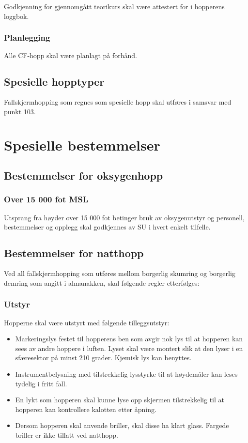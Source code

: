 Godkjenning for gjennomgått teorikurs skal være attestert for i hopperens loggbok.

\subsubsection{Planlegging}
Alle CF-hopp skal være planlagt på forhånd.

\subsection{Spesielle hopptyper}
Fallskjermhopping som regnes som spesielle hopp skal utføres i samsvar med punkt 103.

\section{Spesielle bestemmelser}
\subsection{Bestemmelser for oksygenhopp}
\subsubsection{Over 15 000 fot MSL}
Utsprang fra høyder over 15 000 fot betinger bruk av oksygenutstyr og personell, bestemmelser og opplegg skal godkjennes av SU i hvert enkelt tilfelle.

\subsection{Bestemmelser for natthopp}
Ved all fallskjermhopping som utføres mellom borgerlig skumring og borgerlig demring som angitt i almanakken, skal følgende regler etterfølges:

\subsubsection{Utstyr}
Hopperne skal være utstyrt med følgende tilleggsutstyr:
\begin{itemize}
	\item Markeringslys festet til hopperens ben som avgir nok lys til at hopperen kan sees av andre hoppere i luften. Lyset skal være montert slik at den lyser i en sfæresektor på minst 210 grader. Kjemisk lys kan benyttes.
	\item Instrumentbelysning med tilstrekkelig lysstyrke til at høydemåler kan leses tydelig i fritt fall.
	\item En lykt som hopperen skal kunne lyse opp skjermen tilstrekkelig til at hopperen kan kontrollere kalotten etter åpning.
	\item Dersom hopperen skal anvende briller, skal disse ha klart glass. Fargede briller er ikke tillatt ved natthopp.
\end{itemize}

